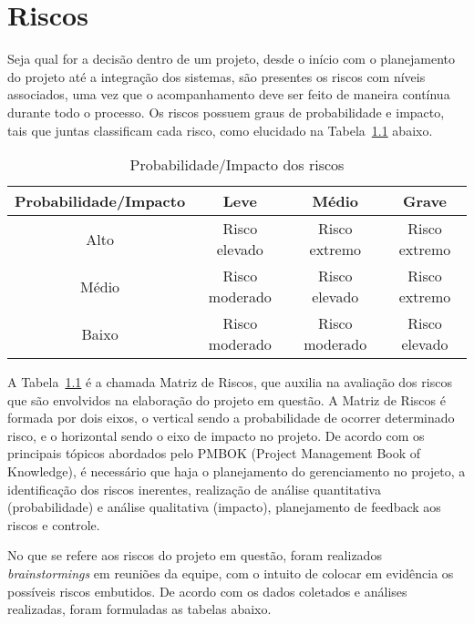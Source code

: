 \chapter{Riscos}
Seja qual for a decisão dentro de um projeto, desde o início com o
planejamento do projeto até a integração dos sistemas, são presentes os riscos
com níveis associados, uma vez que o acompanhamento deve ser feito de maneira contínua
durante todo o processo.
Os riscos possuem graus de probabilidade e impacto, tais que juntas classificam
cada risco, como elucidado na Tabela~\ref{tab:probimp} abaixo.

\begin{table}[h]
\centering
\vspace{0.5cm}
\begin{tabular}{|c|c|c|c|}
\hline
Probabilidade/Impacto & Leve            & Médio          & Grave \\
\hline
Alto                  & Risco elevado   & Risco extremo  & Risco extremo \\
Médio                 & Risco moderado  & Risco elevado  & Risco extremo \\
Baixo                 & Risco moderado  & Risco moderado & Risco elevado \\
\hline
\end{tabular}
\caption{Probabilidade/Impacto dos riscos}
\label{tab:probimp}
\end{table}

A Tabela~\ref{tab:probimp} é a chamada Matriz de Riscos, que auxilia na avaliação dos riscos
que são envolvidos na elaboração do projeto em questão. A Matriz de Riscos é
formada por dois eixos, o vertical sendo a probabilidade de ocorrer determinado risco,
e o horizontal sendo o eixo de impacto no projeto. De acordo com os principais tópicos
abordados pelo PMBOK (Project Management Book of Knowledge), é necessário que
haja o planejamento do gerenciamento no projeto, a identificação dos riscos
inerentes, realização de análise quantitativa (probabilidade) e análise qualitativa
(impacto), planejamento de feedback aos riscos e controle.

No que se refere aos riscos do projeto em questão, foram realizados
\textit{brainstormings} em reuniões da equipe, com o intuito de colocar em evidência os
possíveis riscos embutidos. De acordo com os dados coletados e análises realizadas,
foram formuladas as tabelas abaixo.


